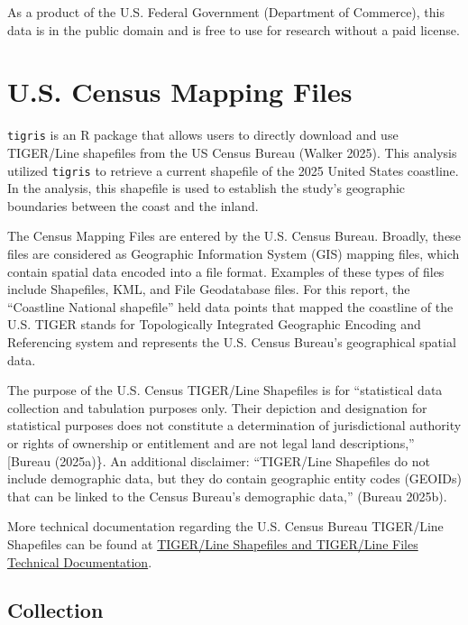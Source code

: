 \documentclass[
  letterpaper,
  DIV=11,
  numbers=noendperiod]{scrreprt}
\begin{document}
As a product of the U.S. Federal Government (Department of Commerce),
this data is in the public domain and is free to use for research
without a paid license.

\section{U.S. Census Mapping Files}\label{u.s.-census-mapping-files}

\texttt{tigris} is an R package that allows users to directly download
and use TIGER/Line shapefiles from the US Census Bureau (Walker 2025).
This analysis utilized \texttt{tigris} to retrieve a current shapefile
of the 2025 United States coastline. In the analysis, this shapefile is
used to establish the study's geographic boundaries between the coast
and the inland.

The Census Mapping Files are entered by the U.S. Census Bureau. Broadly,
these files are considered as Geographic Information System (GIS)
mapping files, which contain spatial data encoded into a file format.
Examples of these types of files include Shapefiles, KML, and File
Geodatabase files. For this report, the ``Coastline National shapefile''
held data points that mapped the coastline of the U.S. TIGER stands for
Topologically Integrated Geographic Encoding and Referencing system and
represents the U.S. Census Bureau's geographical spatial data.

The purpose of the U.S. Census TIGER/Line Shapefiles is for
``statistical data collection and tabulation purposes only. Their
depiction and designation for statistical purposes does not constitute a
determination of jurisdictional authority or rights of ownership or
entitlement and are not legal land descriptions,'' {[}Bureau (2025a)\}.
An additional disclaimer: ``TIGER/Line Shapefiles do not include
demographic data, but they do contain geographic entity codes (GEOIDs)
that can be linked to the Census Bureau's demographic data,'' (Bureau
2025b).

More technical documentation regarding the U.S. Census Bureau TIGER/Line
Shapefiles can be found at
\href{https://www.census.gov/programs-surveys/geography/technical-documentation/complete-technical-documentation/tiger-geo-line.html}{TIGER/Line
Shapefiles and TIGER/Line Files Technical Documentation}.

\subsection{Collection}\label{collection-1}
\end{document}
